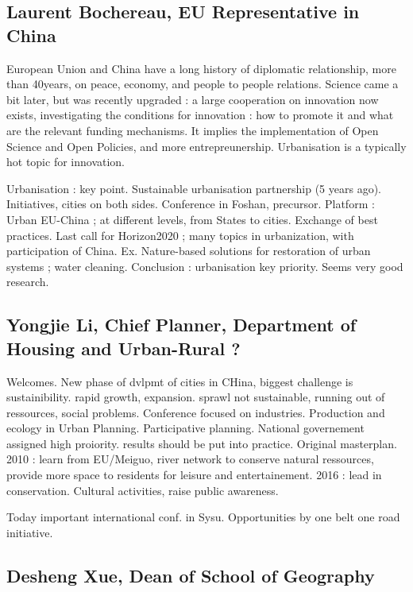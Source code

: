\documentclass[11pt]{article}
\begin{document}
\subsection*{Laurent Bochereau, EU Representative in China}

European Union and China have a long history of diplomatic relationship, more than 40years, on peace, economy, and people to people relations. Science came a bit later, but was recently upgraded : a large cooperation on innovation now exists, investigating the conditions for innovation : how to promote it and what are the relevant funding mechanisms. It implies the implementation of Open Science and Open Policies, and more entrepreunership. Urbanisation is a typically hot topic for innovation.

Urbanisation : key point. Sustainable urbanisation partnership (5 years ago). Initiatives, cities on both sides. Conference in Foshan, precursor. Platform : Urban EU-China ; at different levels, from States to cities. Exchange of best practices. Last call for Horizon2020 ; many topics in urbanization, with participation of China. Ex. Nature-based solutions for restoration of urban systems ; water cleaning. Conclusion : urbanisation key priority. Seems very good research.

\subsection*{Yongjie Li, Chief Planner, Department of Housing and Urban-Rural ?}

Welcomes. New phase of dvlpmt of cities in CHina, biggest challenge is sustainibility. rapid growth, expansion. sprawl not sustainable, running out of ressources, social problems. Conference focused on industries. Production and ecology in Urban Planning. Participative planning. National governement assigned high proiority. results should be put into practice. Original masterplan. 2010 : learn from EU/Meiguo, river network to conserve natural ressources, provide more space to residents for leisure and entertainement. 2016 : lead in conservation. Cultural activities, raise public awareness. 

Today important international conf. in Sysu. Opportunities by one belt one road initiative. 



\subsection*{Desheng Xue, Dean of School of Geography}
\end{document}
